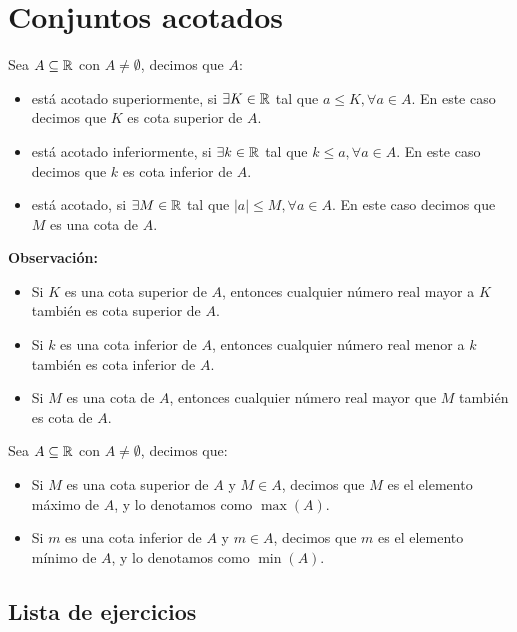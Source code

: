 \section*{Conjuntos acotados}

 Sea $A\subseteq \mathbb{R}$ con $A\neq \emptyset$, decimos que $A$:
\begin{itemize}
 \item está acotado superiormente, si $\exists K\in \mathbb{R}$ tal que $a \leq K, \forall a\in A$. En este caso decimos que $K$ es cota superior de $A$.

 \item está acotado inferiormente, si $\exists k\in \mathbb{R}$ tal que $k \leq a, \forall a\in A$. En este caso decimos que $k$ es cota inferior de $A$.

 \item está acotado, si $\exists M\in \mathbb{R}$ tal que $|a|\leq M,\forall a \in A$. En este caso decimos que $M$ es una cota de $A$.
\end{itemize}

\textbf{Observación:}
\begin{itemize}
  \item Si $K$ es una cota superior de $A$, entonces cualquier número real mayor a $K$ también es cota superior de $A$. 
  \item Si $k$ es una cota inferior de $A$, entonces cualquier número real menor a $k$ también es cota inferior de $A$.
  \item Si $M$ es una cota de $A$, entonces cualquier número real mayor que $M$ también es cota de $A$.
\end{itemize}

 Sea $A\subseteq \mathbb{R}$ con $A\neq \emptyset$, decimos que:
\begin{itemize}
  \item Si $M$ es una cota superior de $A$ y $M\in A$, decimos que $M$ es el elemento máximo de $A$, y lo denotamos como $\max(A)$.
  \item Si $m$ es una cota inferior de $A$ y $m\in A$, decimos que $m$ es el elemento mínimo de $A$, y lo denotamos como $\min(A)$.
\end{itemize}


\subsection*{Lista de ejercicios}

